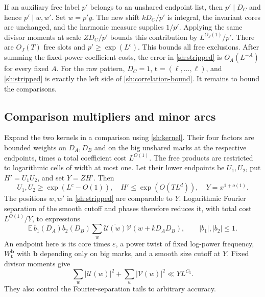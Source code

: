 If an auxiliary free label $p'$ belongs to an unshared endpoint
list, then $p'\mid D_C$ and hence $p'\mid w,w'$.  Set $w=p'y$.
The new shift $kD_C/p'$ is integral, the invariant cores are
unchanged, and the harmonic measure supplies $1/p'$.  Applying the
same divisor moments at scale $ZD_C/p'$ bounds this contribution
by $L^{O_J(1)}/p'$.  There are $O_J(T)$ free slots and
$p'\geq\exp(L^c)$.  This bounds all free exclusions.  After summing
the fixed-power coefficient costs, the error in
\eqref{sh:stripped} is $O_A(L^{-A})$ for every fixed $A$.
For the raw pattern, $D_C=1$, $\mathbf t=(\ell,\ldots,\ell)$,
and \eqref{sh:stripped} is exactly the left side of
\eqref{sh:correlation-bound}.  It remains to bound the comparisons.

\subsection{Comparison multipliers and minor arcs}

Expand the two kernels in a comparison using \eqref{sh:kernel}.
Their four factors are bounded weights on $D_A,D_B$ and on the
big unshared marks at the respective endpoints, times a total
coefficient cost $L^{O(1)}$.  The free products are restricted to
logarithmic cells of width at most one.  Let their lower endpoints
be $U_1,U_2$, put $H'=U_1U_2$, and set $Y=ZH'$.  Then
\begin{equation}\label{sh:comparison-scales}
 U_1,U_2\geq\exp(L^c-O(1)),\quad
 H'\leq\exp(O(TL^d)),\quad Y=x^{1+o(1)}.
\end{equation}
The positions $w,w'$ in \eqref{sh:stripped} are comparable to $Y$.
Logarithmic Fourier separation of the smooth cutoff and phases
therefore reduces it, with total cost $L^{O(1)}/Y$, to expressions
\begin{equation}\label{sh:comparison-convolution}
 \mathbb E\,b_1(D_A)b_2(D_B)
       \sum_w\overline{\mathcal U(w)}\mathcal V(w+kD_AD_B),
 \qquad |b_1|,|b_2|\leq1.
\end{equation}
An endpoint here is its core times $\varepsilon$, a power twist of
fixed log-power frequency, $W_{\mathbf t}^{\mathbf b}$ with
$\mathbf b$ depending only on big marks, and a smooth size cutoff
at $Y$.  Fixed divisor moments give
\begin{equation}\label{sh:comparison-norms}
 \sum_w|\mathcal U(w)|^2+\sum_w|\mathcal V(w)|^2
 \ll YL^{C_5}.
\end{equation}
They also control the Fourier-separation tails to arbitrary accuracy.


